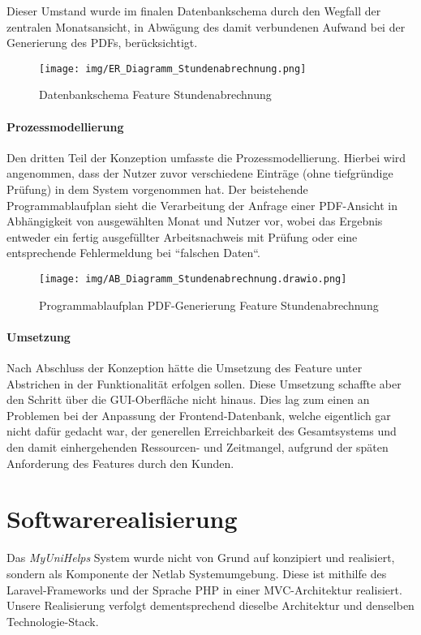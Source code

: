 \documentclass[12pt,a4paper]{scrartcl}
\newcommand{\italic}[1]{\textit{#1}}
\begin{document}
Dieser Umstand wurde im finalen Datenbankschema durch den Wegfall der zentralen Monatsansicht, in Abwägung des damit verbundenen Aufwand bei der Generierung des PDFs, berücksichtigt.\\

\begin{figure}[H]
	\centering
	\texttt{[image: img/ER\_Diagramm\_Stundenabrechnung.png]}
	\caption{Datenbankschema Feature Stundenabrechnung}
	\label{fig:bpmn-process}
\end{figure}

\paragraph*{Prozessmodellierung}

Den dritten Teil der Konzeption umfasste die Prozessmodellierung. Hierbei wird angenommen, dass der Nutzer zuvor verschiedene Einträge (ohne tiefgründige Prüfung) in dem System vorgenommen hat. Der beistehende Programmablaufplan sieht die Verarbeitung der Anfrage einer PDF-Ansicht in Abhängigkeit von ausgewählten Monat und Nutzer vor, wobei das Ergebnis entweder ein fertig ausgefüllter Arbeitsnachweis mit Prüfung oder eine entsprechende Fehlermeldung bei “falschen Daten“.

\begin{figure}[H]
	\centering
	\texttt{[image: img/AB\_Diagramm\_Stundenabrechnung.drawio.png]}
	\caption{Programmablaufplan PDF-Generierung Feature Stundenabrechnung}
	\label{fig:bpmn-process}
\end{figure}

\paragraph*{Umsetzung}

Nach Abschluss der Konzeption hätte die Umsetzung des Feature unter Abstrichen in der Funktionalität erfolgen sollen. Diese Umsetzung schaffte aber den Schritt über die GUI-Oberfläche nicht hinaus. Dies lag zum einen an Problemen bei der Anpassung der Frontend-Datenbank, welche eigentlich gar nicht dafür gedacht war, der generellen Erreichbarkeit des Gesamtsystems und den damit einhergehenden Ressourcen- und Zeitmangel, aufgrund der späten Anforderung des Features durch den Kunden.

\section{Softwarerealisierung}
\label{impl}
Das \italic{MyUniHelps} System wurde nicht von Grund auf konzipiert und realisiert, sondern als Komponente der Netlab Systemumgebung.
Diese ist mithilfe des Laravel-Frameworks und der Sprache PHP in einer MVC-Architektur \cite{Goll.2014} realisiert.
Unsere Realisierung verfolgt dementsprechend dieselbe Architektur und denselben Technologie-Stack.
\end{document}
